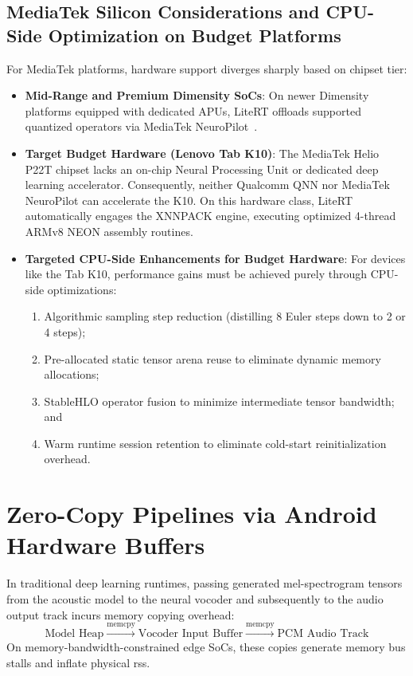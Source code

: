 \subsection{MediaTek Silicon Considerations and CPU-Side Optimization on Budget Platforms}
For MediaTek platforms, hardware support diverges sharply based on chipset tier:
\begin{itemize}
    \item \textbf{Mid-Range and Premium Dimensity SoCs}: On newer Dimensity platforms equipped with dedicated APUs, LiteRT offloads supported quantized operators via MediaTek NeuroPilot~\cite{mediatek_neuropilot2024}.
    \item \textbf{Target Budget Hardware (Lenovo Tab K10)}: The MediaTek Helio P22T chipset lacks an on-chip Neural Processing Unit or dedicated deep learning accelerator. Consequently, neither Qualcomm QNN nor MediaTek NeuroPilot can accelerate the K10. On this hardware class, LiteRT automatically engages the XNNPACK engine, executing optimized 4-thread ARMv8 NEON assembly routines.
    \item \textbf{Targeted CPU-Side Enhancements for Budget Hardware}: For devices like the Tab K10, performance gains must be achieved purely through CPU-side optimizations:
    \begin{enumerate}[label=(\alph*)]
        \item Algorithmic sampling step reduction (distilling 8 Euler steps down to 2 or 4 steps);
        \item Pre-allocated static tensor arena reuse to eliminate dynamic memory allocations;
        \item StableHLO operator fusion to minimize intermediate tensor bandwidth; and
        \item Warm runtime session retention to eliminate cold-start reinitialization overhead.
    \end{enumerate}
\end{itemize}

\section{Zero-Copy Pipelines via Android Hardware Buffers}
In traditional deep learning runtimes, passing generated mel-spectrogram tensors from the acoustic model to the neural vocoder and subsequently to the audio output track incurs memory copying overhead:
\begin{equation}
    \text{Model Heap} \xrightarrow{\text{memcpy}} \text{Vocoder Input Buffer} \xrightarrow{\text{memcpy}} \text{PCM Audio Track}
\end{equation}
On memory-bandwidth-constrained edge SoCs, these copies generate memory bus stalls and inflate physical \acrshort{rss}.

